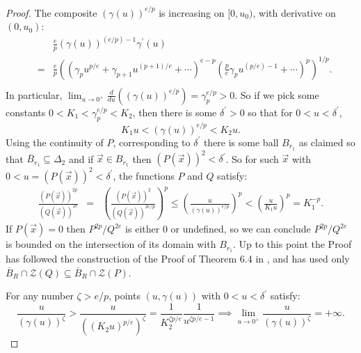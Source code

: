\documentclass[12pt]{amsart}
\theoremstyle{definition}
\theoremstyle{remark}
\numberwithin{equation}{section}
\newcommand{\vv}{\mathcal{Z}}
\begin{document}
\begin{proof}
    The composite $(\gamma(u))^{e/p}$ is increasing on $[0,u_0)$, with derivative on $(0,u_0)$:
    \begin{eqnarray*}
        &&\frac ep(\gamma(u))^{(e/p)-1}\gamma^\prime(u)\\
        &=&\frac ep\left(\left(\gamma_pu^{p/e}+\gamma_{p+1}u^{(p+1)/e}+\cdots\right)^{e-p}\left(\frac pe\gamma_p u^{(p/e)-1}+\cdots\right)^p\right)^{1/p}.\\
    \end{eqnarray*}
    In particular, $\displaystyle{\lim_{u\to0^+}\frac d{du}\left((\gamma(u))^{e/p}\right)=\gamma_p^{e/p}>0}$.
    So if we pick some constants $0<K_1<\gamma_p^{e/p}<K_2$, then there is some $\delta^\prime>0$ so that for $0<u<\delta^\prime$, $$K_1u<(\gamma(u))^{e/p}<K_2u.$$  Using the continuity of $P$, corresponding to $\delta^\prime$ there is some ball $B_{r_1}$ as claimed so that $\overline{B}_{r_1}\subseteq\Delta_2$ and if $\vec x\in B_{r_1}$ then $(P(\vec x))^2<\delta^\prime$.  So for such $\vec x$ with $0<u=(P(\vec x))^2<\delta^\prime$, the functions $P$ and $Q$ satisfy:
    \begin{eqnarray*}
      \frac{(P(\vec x))^{2p}}{(Q(\vec x))^{2e}}&=&\left(\frac{(P(\vec x))^2}{(Q(\vec x))^{2e/p}}\right)^p\le\left(\frac u{(\gamma(u))^{e/p}}\right)^p<\left(\frac u{K_1u}\right)^p=K_1^{-p}.
\end{eqnarray*}
    If $P(\vec x)=0$ then $P^{2p}/Q^{2e}$ is either $0$ or undefined, so we can conclude $P^{2p}/Q^{2e}$ is bounded on the intersection of its domain with $B_{r_1}$.  Up to this point the Proof has followed the construction of the Proof of Theorem 6.4 in \cite{bm}, and has used only ${\overline B}_R\cap\vv(Q)\subseteq{\overline B}_R\cap\vv(P)$.

    For any number $\zeta>e/p$, points $(u,\gamma(u))$ with $0<u<\delta^\prime$ satisfy:
    $$\frac{u}{(\gamma(u))^\zeta}>\frac u{((K_2u)^{p/e})^\zeta}=\frac1{K_2^{\zeta p/e}}\frac1{u^{\zeta p/e-1}}\implies \lim_{u\to0^+}\frac u{(\gamma(u))^\zeta}=+\infty.$$


\end{proof}
\end{document}
